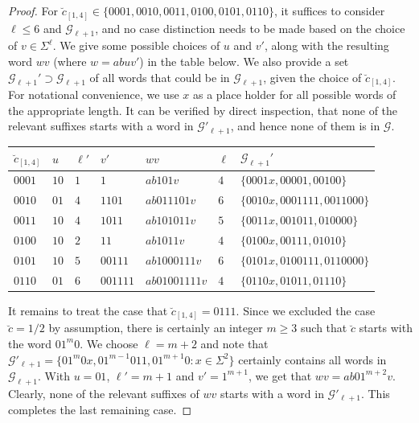 \documentclass[11pt,reqno]{amsart}
\theoremstyle{plain}
\theoremstyle{definition}
\newcommand{\mc}{\mathcal}
\begin{document}
\begin{proof}
For $\breve{c}_{[1,4]} \in \{0001,0010,0011,0100,0101,0110 \}$, it suffices to consider $\ell \leqslant 6$ and $\mc G_{\ell+1}$, and no case distinction needs to be made based on the choice of $v \in \Sigma^\ell$. We give some possible choices of $u$ and $v'$, along with the resulting word $w v$ (where $w=abuv'$) in the table below. We also provide a set $\mc G_{\ell+1}' \supset \mc G_{\ell+1}$ of all words that could be in $\mc G_{\ell+1}$, given the choice of $\breve{c}_{[1,4]}$. For notational convenience, we use $x$ as a place holder for all possible words of the appropriate length. It can be verified by direct inspection, that none of the relevant suffixes starts with a word in $\mc G'_{\ell+1}$, and hence none of them is in $\mc G$.
\begin{center}
    \begin{tabular}{ | l | l | l | l | l | l | l |}
    \hline
    $\breve{c}_{[1,4]}$ & $u$ & $\ell'$ & $v'$ & $wv$ & $\ell$ & $\mc G_{\ell+1}'$ \\ \hline
    $0001$ & $10$ & $1$ &  $1$ & $ab101v$ & $4$ & $\{0001x,00001,00100 \}$  \\ 
     $0010$ & $01$ & $4$ &  $1101$ & $ab011101v$ & $6$ & $\{0010x,0001111,0011000 \}$  \\ 
     $0011$ & $10$ & $4$ & $1011$ & $ab101011v$ & $5$ & $\{0011x,001011,010000 \}$  \\ 
     $0100$ & $10$ & $2$ &  $11$ & $ab1011v$ & $4$ & $\{0100x,00111,01010 \}$  \\ 
     $0101$ & $10$ & $5$ &  $00111$ & $ab1000111v$ & $6$ & $\{0101x,0100111,0110000 \}$  \\ 
     $0110$ & $01$ & $6$ &  $001111$ & $ab01001111v$ & $4$ & $\{0110x,01011,01110 \}$  \\ 
    \hline
    \end{tabular}
\end{center}
It remains to treat the case that $\breve{c}_{[1,4]} = 0111$. Since we excluded the case $\breve{c} = 1/2$ by assumption, there is certainly an integer $m \geqslant 3$ such that $\breve{c}$ starts with the word $01^m0$. We choose $\ell = m+2$ and note that $\mc G'_{\ell+1} = \{ 01^m 0 x, 01^{m-1}011, 01^{m+1}0 : x \in \Sigma^2 \}$ certainly contains all words in $\mc G_{\ell+1}$. With $u = 01$, $\ell'= m+1$ and $v'=1^{m+1}$, we get that $wv = ab01^{m+2}v$. Clearly, none of the relevant suffixes of $wv$ starts with a word in $\mc G'_{\ell+1}$. This completes the last remaining case.
\end{proof}
\end{document}
